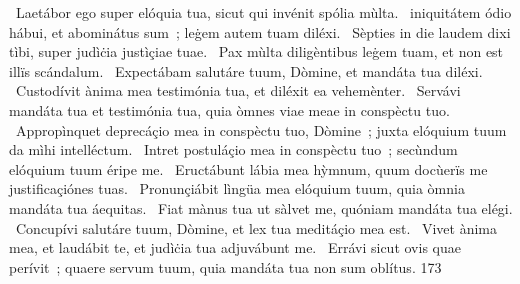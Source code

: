 {~Laetábor ego super elóquia tua, sicut qui invénit spólia mùlta.
~iniquitátem ódio hábui, et abominátus sum~; leġem autem tuam diléxi.
~Sèpties in die laudem dixi tìbi, super judìċia justìçiae tuae.
~Pax mùlta diligèntibus leġem tuam, et non est illïs scándalum.
~Expectábam salutáre tuum, Dòmine, et mandáta tua diléxi.
~Custodívit ànima mea testimónia tua, et diléxit ea vehemènter.
~Servávi mandáta tua et testimónia tua, quia òmnes viae meae in conspèctu tuo.
~Appropìnquet deprecáçio mea in conspèctu tuo, Dòmine~; juxta elóquium tuum da mìhi intelléctum.
~Intret postuláçio mea in conspèctu tuo~; secùndum elóquium tuum éripe me.
~Eructábunt lábia mea hỳmnum, quum docùerïs me justificaçiónes tuas.
~Pronunçiábit lìngüa mea elóquium tuum, quia òmnia mandáta tua áequitas.
~Fiat mànus tua ut sàlvet me, quóniam mandáta tua elégi.
~Concupívi salutáre tuum, Dòmine, et lex tua meditáçio mea est.
~Vivet ànima mea, et laudábit te, et judìċia tua adjuvábunt me.
~Errávi sicut ovis quae perívit~; quaere servum tuum, quia mandáta tua non sum oblítus.
}
{17}{3}
